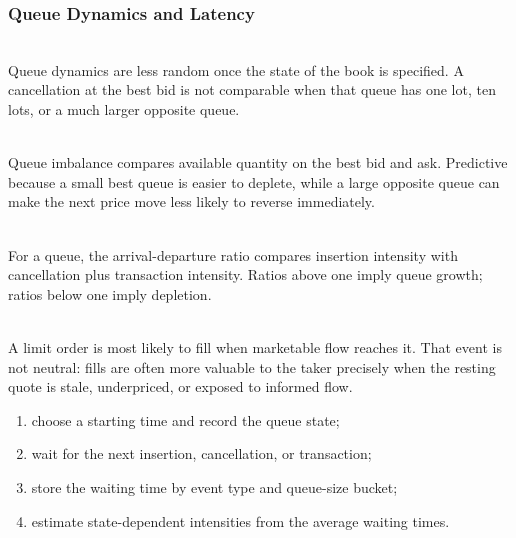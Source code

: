 \subsubsection{Queue Dynamics and Latency}

\begin{principle} \\
Queue dynamics are less random once the state of the book is specified. A cancellation at the best bid is not comparable when that queue has one lot, ten lots, or a much larger opposite queue.
\end{principle}

\begin{definition} \\
Queue imbalance compares available quantity on the best bid and ask. Predictive because a small best queue is easier to deplete, while a large opposite queue can make the next price move less likely to reverse immediately.
\end{definition}

\begin{mechanism} \\
For a queue, the arrival-departure ratio compares insertion intensity with cancellation plus transaction intensity. Ratios above one imply queue growth; ratios below one imply depletion.
\end{mechanism}

\begin{caveat} \\
A limit order is most likely to fill when marketable flow reaches it. That event is not neutral: fills are often more valuable to the taker precisely when the resting quote is stale, underpriced, or exposed to informed flow.
\end{caveat}

\begin{process} 
\begin{enumerate}[label=\roman*.]
\setlength{\itemsep}{0pt}
\item choose a starting time and record the queue state;
\item wait for the next insertion, cancellation, or transaction;
\item store the waiting time by event type and queue-size bucket;
\item estimate state-dependent intensities from the average waiting times.
\end{enumerate}
\end{process}

